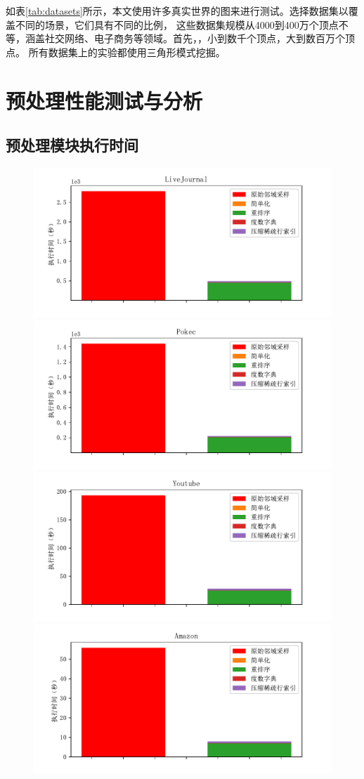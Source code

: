 \documentclass[master]{thesis-uestc}
\begin{document}
    如表\ref{tab:datasets}所示，本文使用许多真实世界的图来进行测试。选择数据集以覆盖不同的场景，它们具有不同的比例，
这些数据集规模从4000到400万个顶点不等，涵盖社交网络、电子商务等领域。首先，，小到数千个顶点，大到数百万个顶点。
所有数据集上的实验都使用三角形模式挖掘。

\section{预处理性能测试与分析}
\label{sec:preprocessing-exp}
\subsection{预处理模块执行时间}
\label{subsec:pre-time}

\begin{figure}
    \includegraphics[width=0.5\linewidth]{pic/preTime/LiveJournal.pdf}%
    \includegraphics[width=0.5\linewidth]{pic/preTime/Pokec.pdf}\\
    \includegraphics[width=0.5\linewidth]{pic/preTime/Youtube.pdf}%
    \includegraphics[width=0.5\linewidth]{pic/preTime/Amazon.pdf}\\

\end{figure}
\end{document}

